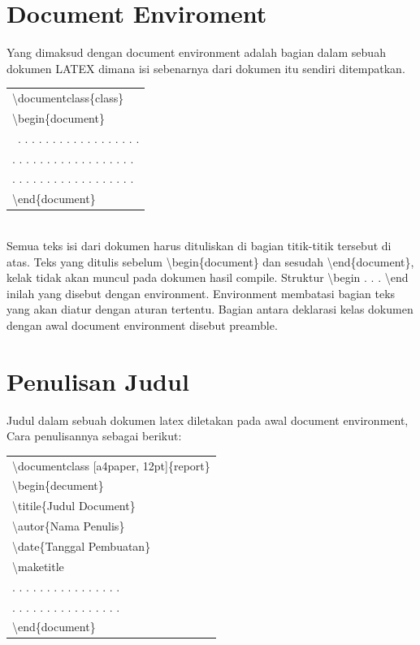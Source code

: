 \section{Document Enviroment}
Yang dimaksud dengan document environment adalah bagian dalam sebuah dokumen LATEX dimana isi sebenarnya dari dokumen itu sendiri ditempatkan.\\[0.5 cm]
\begin{tabular}{|p{13.5 cm}|}
\hline
\textbackslash documentclass\{class\}\\
\textbackslash begin\{document\}\\\
. . . . . . . . . . . . . . . . . .\\
. . . . . . . . . . . . . . . . . .\\
. . . . . . . . . . . . . . . . . .\\
\textbackslash end\{document\}\\
\hline

\end{tabular}\\[0.5 cm]
Semua teks isi dari dokumen harus dituliskan di bagian titik-titik tersebut di atas. Teks yang ditulis sebelum \textbackslash begin\{document\} dan sesudah \textbackslash end\{document\}, kelak tidak akan muncul pada dokumen hasil compile. Struktur \textbackslash begin . . . \textbackslash end inilah yang disebut dengan environment. Environment membatasi bagian teks yang akan diatur dengan aturan tertentu. Bagian antara deklarasi kelas dokumen dengan awal document environment disebut preamble.
\section{Penulisan Judul}
Judul dalam sebuah dokumen latex diletakan pada awal document environment, Cara penulisannya sebagai berikut:\\[0.5 cm]
\begin{tabular}{|p{13.5 cm}|}
\hline
\textbackslash documentclass [a4paper, 12pt]\{report\}\\
\textbackslash begin\{decument\}\\
        \textbackslash titile\{Judul Document\}\\
        \textbackslash autor\{Nama Penulis\}\\
        \textbackslash date\{Tanggal Pembuatan\}\\
        \textbackslash maketitle\\
. . . . . . . . . . . . . . . .\\
. . . . . . . . . . . . . . . . \\
\textbackslash end\{document\}\\

\hline

\end{tabular}\\[0.5 cm]
